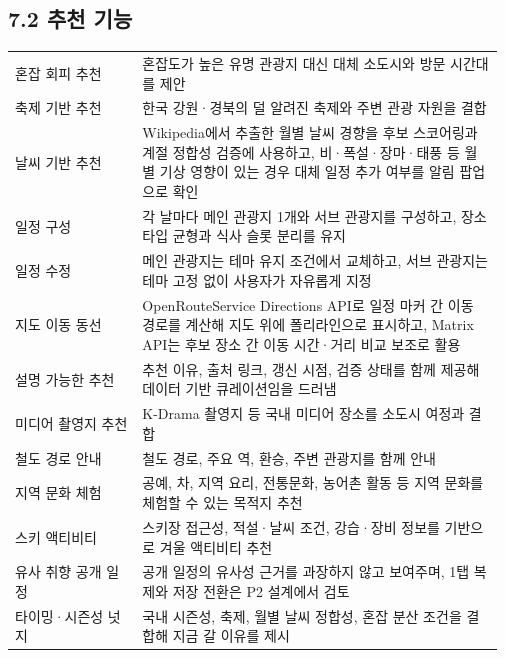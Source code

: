 \documentclass[12pt,a4paper]{article}
\newcommand{\DocNeedspace}[1]{\par\ifdim\dimexpr\pagegoal-\pagetotal\relax<#1\newpage\fi}
\renewcommand{\arraystretch}{1.35}
\begin{document}
\DocNeedspace{24\baselineskip}
\subsection*{7.2 추천 기능}


\DocNeedspace{32\baselineskip}
\begin{small}
\setlength{\tabcolsep}{3pt}
\setlength{\extrarowheight}{1pt}
\renewcommand{\arraystretch}{1.42}
\begin{longtable}{@{}>{\centering\arraybackslash}m{0.258\linewidth}>{\RaggedRight\arraybackslash}m{0.714\linewidth}@{}}
\toprule
\multicolumn{1}{>{\centering\arraybackslash}m{0.258\linewidth}}{\textbf{기능}} & \multicolumn{1}{>{\centering\arraybackslash}m{0.714\linewidth}}{\textbf{설명}} \\
\midrule
\endhead
혼잡 회피 추천 & 혼잡도가 높은 유명 관광지 대신 대체 소도시와 방문 시간대를 제안 \\
축제 기반 추천 & 한국 강원·경북의 덜 알려진 축제와 주변 관광 자원을 결합 \\
날씨 기반 추천 & Wikipedia에서 추출한 월별 날씨 경향을 후보 스코어링과 계절 정합성 검증에 사용하고, 비·폭설·장마·태풍 등 월별 기상 영향이 있는 경우 대체 일정 추가 여부를 알림 팝업으로 확인 \\
일정 구성 & 각 날마다 메인 관광지 1개와 서브 관광지를 구성하고, 장소 타입 균형과 식사 슬롯 분리를 유지 \\
일정 수정 & 메인 관광지는 테마 유지 조건에서 교체하고, 서브 관광지는 테마 고정 없이 사용자가 자유롭게 지정 \\
지도 이동 동선 & OpenRouteService Directions API로 일정 마커 간 이동 경로를 계산해 지도 위에 폴리라인으로 표시하고, Matrix API는 후보 장소 간 이동 시간·거리 비교 보조로 활용 \\
설명 가능한 추천 & 추천 이유, 출처 링크, 갱신 시점, 검증 상태를 함께 제공해 데이터 기반 큐레이션임을 드러냄 \\
미디어 촬영지 추천 & K-Drama 촬영지 등 국내 미디어 장소를 소도시 여정과 결합 \\
철도 경로 안내 & 철도 경로, 주요 역, 환승, 주변 관광지를 함께 안내 \\
지역 문화 체험 & 공예, 차, 지역 요리, 전통문화, 농어촌 활동 등 지역 문화를 체험할 수 있는 목적지 추천 \\
스키 액티비티 & 스키장 접근성, 적설·날씨 조건, 강습·장비 정보를 기반으로 겨울 액티비티 추천 \\
유사 취향 공개 일정 & 공개 일정의 유사성 근거를 과장하지 않고 보여주며, 1탭 복제와 저장 전환은 P2 설계에서 검토 \\
타이밍·시즌성 넛지 & 국내 시즌성, 축제, 월별 날씨 정합성, 혼잡 분산 조건을 결합해 지금 갈 이유를 제시 \\
\bottomrule
\end{longtable}
\end{small}
\end{document}
